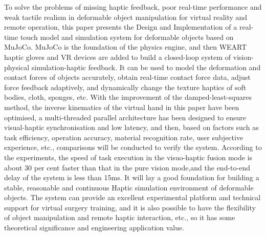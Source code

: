 \begin{abstracten}

To solve the problems of missing haptic feedback, poor real-time performance and weak tactile realism in deformable object manipulation for virtual reality and remote operation, this paper presents the Design and Implementation of a real-time touch model and simulation system for deformable objects based on MuJoCo. MuJoCo is the foundation of the physics engine, and then WEART haptic gloves and VR devices are added to build a closed-loop system of vision-physical simulation-haptic feedback. It can be used to model the deformation and contact forces of objects accurately, obtain real-time contact force data, adjust force feedback adaptively, and dynamically change the texture haptics of soft bodies, cloth, sponges, etc. With the improvement of the damped-least-squares method, the inverse kinematics of the virtual hand in this paper have been optimised, a multi-threaded parallel architecture has been designed to ensure visual-haptic synchronisation and low latency, and then, based on factors such as task efficiency, operation accuracy, material recognition rate, user subjective experience, etc., comparisons will be conducted to verify the system. According to the experiments, the speed of task execution in the visuo-haptic fusion mode is about 30 per cent faster than that in the pure vision mode,and the end-to-end delay of the system is less than 15ms. It will lay a good foundation for building a stable, reasonable and continuous Haptic simulation environment of deformable objects. The system can provide an excellent experimental platform and technical support for virtual surgery training, and it is also possible to have the flexibility of object manipulation and remote haptic interaction, etc., so it has some theoretical significance and engineering application value.

\end{abstracten}
